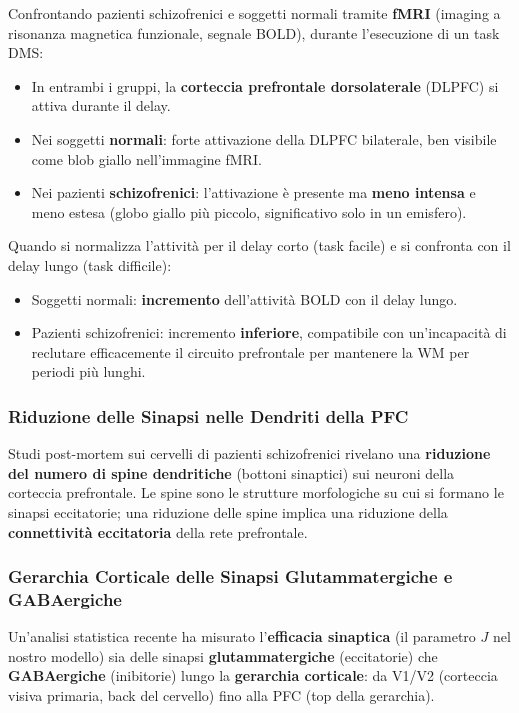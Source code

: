 Confrontando pazienti schizofrenici e soggetti normali tramite \textbf{fMRI} (imaging a risonanza magnetica funzionale, segnale BOLD), durante l'esecuzione di un task DMS:
\begin{itemize}
    \item In entrambi i gruppi, la \textbf{corteccia prefrontale dorsolaterale} (DLPFC) si attiva durante il delay.
    \item Nei soggetti \textbf{normali}: forte attivazione della DLPFC bilaterale, ben visibile come blob giallo nell'immagine fMRI.
    \item Nei pazienti \textbf{schizofrenici}: l'attivazione è presente ma \textbf{meno intensa} e meno estesa (globo giallo più piccolo, significativo solo in un emisfero).
\end{itemize}

Quando si normalizza l'attività per il delay corto (task facile) e si confronta con il delay lungo (task difficile):
\begin{itemize}
    \item Soggetti normali: \textbf{incremento} dell'attività BOLD con il delay lungo.
    \item Pazienti schizofrenici: incremento \textbf{inferiore}, compatibile con un'incapacità di reclutare efficacemente il circuito prefrontale per mantenere la WM per periodi più lunghi.
\end{itemize}




\subsubsection{Riduzione delle Sinapsi nelle Dendriti della PFC}

Studi post-mortem sui cervelli di pazienti schizofrenici rivelano una \textbf{riduzione del numero di spine dendritiche} (bottoni sinaptici) sui neuroni della corteccia prefrontale. Le spine sono le strutture morfologiche su cui si formano le sinapsi eccitatorie; una riduzione delle spine implica una riduzione della \textbf{connettività eccitatoria} della rete prefrontale.

\subsubsection{Gerarchia Corticale delle Sinapsi Glutammatergiche e GABAergiche}

Un'analisi statistica recente ha misurato l'\textbf{efficacia sinaptica} (il parametro $J$ nel nostro modello) sia delle sinapsi \textbf{glutammatergiche} (eccitatorie) che \textbf{GABAergiche} (inibitorie) lungo la \textbf{gerarchia corticale}: da V1/V2 (corteccia visiva primaria, back del cervello) fino alla PFC (top della gerarchia).

